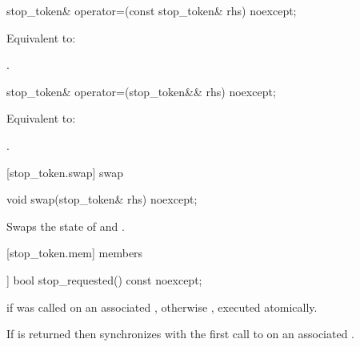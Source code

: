 {%
\begin{itemdecl}
stop_token& operator=(const stop_token& rhs) noexcept;
\end{itemdecl}
\begin{itemdescr}
  \pnum\effects Equivalent to: 

  \pnum\returns {}.
\end{itemdescr}

%
\begin{itemdecl}
stop_token& operator=(stop_token&& rhs) noexcept;
\end{itemdecl}
\begin{itemdescr}
  \pnum\effects Equivalent to: 

  \pnum\returns {}.
\end{itemdescr}

[stop_token.swap]{ swap}

%
\begin{itemdecl}
void swap(stop_token& rhs) noexcept;
\end{itemdecl}

\begin{itemdescr}
\pnum
\effects Swaps the state of  and .
\end{itemdescr}


[stop_token.mem]{ members}

%
\begin{itemdecl}
[[nodiscard]] bool stop_requested() const noexcept;
\end{itemdecl}
\begin{itemdescr}
  \pnum\returns {} if  was called on an
                associated ,
                otherwise , executed atomically.

  \pnum\sync If  is returned then synchronizes with the
             first call to  on an associated
             .
\end{itemdescr}

}
